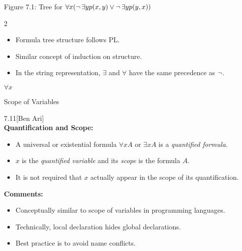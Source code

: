 \documentclass[style=sailor,size=12pt]{powerdot}
\begin{document}
\begin{wideslide}[bm=,toc=]{Figure 7.1: Tree for
$\forall x(\mathop{\neg}\exists yp(x,y)\vee\mathop{\neg}\exists yp(y,x))$}
\begin{multicols}{2}
\begin{itemize}
\item Formula tree structure follows PL.
\item Similar concept of induction on structure.
\item In the string representation, $\exists$ and $\forall$ have the same precedence as $\mathop{\neg}$.
\end{itemize}
\begin{center}
\setlength{\GapWidth}{8mm}
\setlength{\GapDepth}{8mm}
\begin{bundle}{$\forall x$\rule[-1mm]{0mm}{1mm}}
\end{bundle}
\end{center}
\end{multicols}
\end{wideslide}

\begin{wideslide}[bm=,toc=]{Scope of Variables}
\begin{defn}{7.11}[Ben Ari]~\\
\textbf{Quantification and Scope:}
\begin{itemize}
\item<2-> A universal or existential formula $\forall x A$ or $\exists x A$
is a \emph{quantified formula}. 
\item<3-> $x$ is the \emph{quantified variable}
and its \emph{scope} is the formula $A$. 
\item<4-> It is not required that $x$ actually appear in the scope of its 
quantification.
\end{itemize}
\end{defn}
\pause[4]
\textbf{Comments:}
\begin{itemize}
\item<6-> Conceptually similar to scope of variables in programming languages.
\item<7-> Technically, local declaration hides global declarations.
\item<8-> Best practice is to avoid name conflicts.
\end{itemize}
\end{wideslide}
\end{document}
